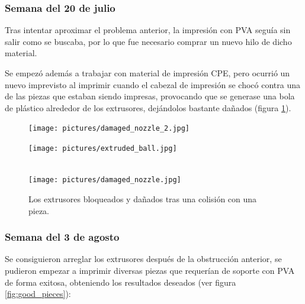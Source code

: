 \subsubsection*{Semana del 20 de julio}
Tras intentar aproximar el problema anterior, la impresión con \ac{PVA} seguía sin
salir como se buscaba, por lo que fue necesario comprar un nuevo hilo de dicho material.

Se empezó además a trabajar con material de impresión \ac{CPE}, pero ocurrió un nuevo
imprevisto al imprimir cuando el cabezal de impresión se chocó contra una de las piezas
que estaban siendo impresas, provocando que se generase una bola de plástico alrededor 
de los extrusores, dejándolos bastante dañados (figura \ref{fig:damaged_nozzle}).

\begin{figure}[H]
    \centering
    \begin{minipage}{.49\linewidth}
        \texttt{[image: pictures/damaged\_nozzle\_2.jpg]}
    \end{minipage}
    \hfill
    \begin{minipage}{.49\linewidth}
        \texttt{[image: pictures/extruded\_ball.jpg]}
    \end{minipage}
    \hfill \\[1ex]
    \texttt{[image: pictures/damaged\_nozzle.jpg]}
    \caption{Los extrusores bloqueados y dañados tras una colisión con una pieza.}
    \label{fig:damaged_nozzle}
\end{figure}

\subsubsection*{Semana del 3 de agosto}
Se consiguieron arreglar los extrusores después de la obstrucción anterior, se pudieron
empezar a imprimir diversas piezas que requerían de soporte con \ac{PVA} de forma
exitosa, obteniendo los resultados deseados (ver figura \ref{fig:good_pieces}):

